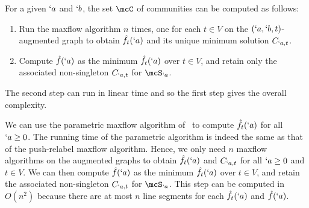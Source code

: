 For a given $`a$ and $`b$, the set $\mcC$ of communities can be computed as follows:
\begin{enumerate}
\item Run the maxflow algorithm $n$ times, one for each $t\in V$ on the $(`a,`b,t)$-augmented graph to obtain $\hat{f}_t(`a)$ and its unique minimum solution $C_{`a,t}$.
\item Compute $\hat{f}(`a)$ as the minimum $\hat{f}_t(`a)$ over $t\in V$, and retain only the associated non-singleton $C_{`a, t}$ for $\mcS_{`a}$. 
\end{enumerate}
The second step can run in linear time and so the first step gives the overall complexity.

We can use the parametric maxflow algorithm of~\cite{gallo89} to compute $\hat{f}_t(`a)$ for all $`a\geq 0$. The running time of the parametric algorithm is indeed the same as that of the push-relabel maxflow algorithm. Hence, we only need $n$ maxflow algorithms on the augmented graphs to obtain $\hat{f}_t(`a)$ and $C_{`a,t}$ for all $`a\geq 0$ and $t\in V$. We can then compute $\hat{f}(`a)$ as the minimum $\hat{f}_t(`a)$ over $t\in V$, and retain the associated non-singleton $C_{`a,t}$ for $\mcS_{`a}$. This step can be computed in $O(n^2)$ because there are at most $n$ line segments for each $\hat{f}_t(`a)$ and $\hat{f}(`a)$. 

